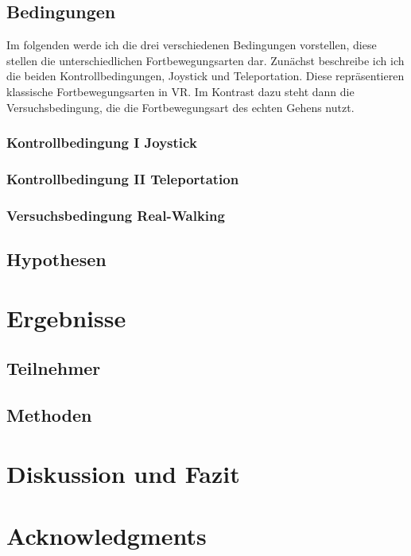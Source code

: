     \section{Bedingungen}\label{sec:conditions}
        Im folgenden werde ich die drei verschiedenen Bedingungen vorstellen, diese stellen die unterschiedlichen Fortbewegungsarten dar. Zunächst beschreibe ich ich die beiden Kontrollbedingungen, Joystick und Teleportation. Diese repräsentieren klassische Fortbewegungsarten in VR. Im Kontrast dazu steht dann die Versuchsbedingung, die die Fortbewegungsart des echten Gehens nutzt.
        \subsection{Kontrollbedingung I Joystick}\label{subsec:joystick}

        \subsection{Kontrollbedingung II Teleportation}\label{subsec:teleport}
        \subsection{Versuchsbedingung Real-Walking}\label{subsec:realwalk}
    \section{Hypothesen}\label{}

\chapter{Ergebnisse}\label{}
    \section{Teilnehmer}\label{}
    \section{Methoden}\label{}

\chapter{Diskussion und Fazit}\label{}

\chapter{Acknowledgments}\label{}


